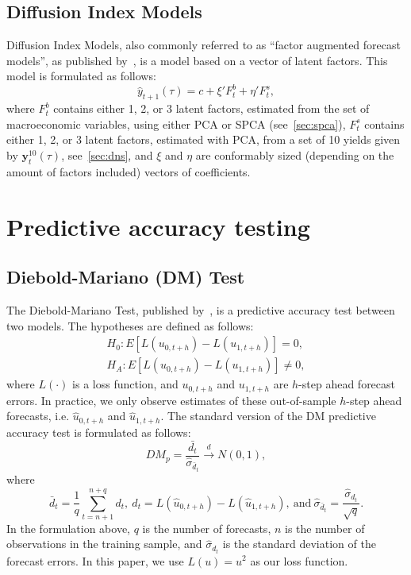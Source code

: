 \subsection{Diffusion Index Models}
\label{sec:dif}
Diffusion Index Models, also commonly referred to as \enquote{factor augmented forecast models}, as published by~\textcite[hereafter DIF]{stock_macroeconomic_2002,stock_forecasting_2002}, is a model based on a vector of latent factors. 
This model is formulated as follows:
\begin{equation}
	\hat{y}_{t+1}(\tau) = c + \xi' F_t^b + \eta' F_t^s,
\end{equation}
where $F_t^b$ contains either 1, 2, or 3 latent factors, estimated from the set of macroeconomic variables, using either PCA or SPCA (see~\cref{sec:spca}), $F_t^s$ contains either 1, 2, or 3 latent factors, estimated with PCA, from a set of 10 yields given by $\mathbf{y}_t^{10}(\tau)$, see~\cref{sec:dns}, and $\xi$ and $\eta$ are conformably sized (depending on the amount of factors included) vectors of coefficients. 

\section{Predictive accuracy testing}
\subsection{Diebold-Mariano (DM) Test}
\label{sec:dmtest}
The Diebold-Mariano Test, published by~\textcite[hereafter DM]{diebold_comparing_1994}, is a predictive accuracy test between two models. 
The hypotheses are defined as follows:
\begin{align*}
	H_0 : E\left[L(u_{0,t+h}) - L(u_{1,t+h})\right] = 0, \\
	H_A : E\left[L(u_{0,t+h}) - L(u_{1,t+h})\right] \neq 0,
\end{align*}
where $L(\cdot)$ is a loss function, and $u_{0,t+h}$ and $u_{1,t+h}$ are $h$-step ahead forecast errors. 
In practice, we only observe estimates of these out-of-sample $h$-step ahead forecasts, i.e. $\hat{u}_{0,t+h}$ and $\hat{u}_{1,t+h}$. The standard version of the DM predictive accuracy test is formulated as follows:
\begin{equation}
	DM_p = \frac{\bar{d_t}}{\hat{\sigma}_{\bar{d}_t}} \overset{d}{\rightarrow} N(0,1),
\end{equation}
where
\begin{equation}
	\bar{d}_t = \frac{1}{q} \sum_{t=n+1}^{n+q} d_t,\ d_t = L(\hat{u}_{0,t+h}) - L(\hat{u}_{1,t+h}),\ \text{and}\ \hat{\sigma}_{\bar{d}_t} = \frac{\hat{\sigma}_{d_t}}{\sqrt{q}}.
\end{equation}
In the formulation above, $q$ is the number of forecasts, $n$ is the number of observations in the training sample, and $\hat{\sigma}_{d_t}$ is the standard deviation of the forecast errors. In this paper, we use $L(u) = u^2$ as our loss function.
